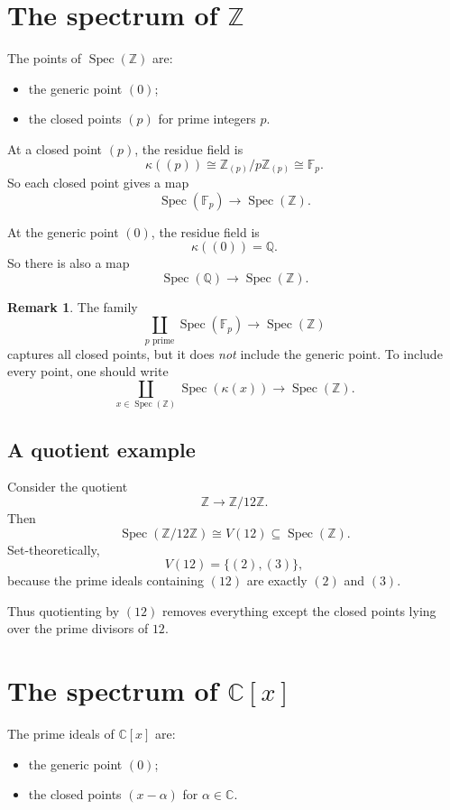 \documentclass[11pt]{article}
\theoremstyle{definition}
\newtheorem{remark}[theorem]{Remark}
\newcommand{\Z}{\mathbb{Z}}
\newcommand{\Q}{\mathbb{Q}}
\newcommand{\C}{\mathbb{C}}
\newcommand{\F}{\mathbb{F}}
\newcommand{\Spec}{\operatorname{Spec}}
\newcommand{\kk}[1]{\kappa\!\left(#1\right)}
\begin{document}
	\section{The spectrum of $\Z$}
	
	The points of $\Spec(\Z)$ are:
	
	\begin{itemize}
		\item the generic point $(0)$;
		\item the closed points $(p)$ for prime integers $p$.
	\end{itemize}
	
	At a closed point $(p)$, the residue field is
	\[
	\kk{(p)}\cong \Z_{(p)}/p\Z_{(p)}\cong \F_p.
	\]
	So each closed point gives a map
	\[
	\Spec(\F_p)\longrightarrow \Spec(\Z).
	\]
	
	At the generic point $(0)$, the residue field is
	\[
	\kk{(0)}=\Q.
	\]
	So there is also a map
	\[
	\Spec(\Q)\longrightarrow \Spec(\Z).
	\]
	
	\begin{remark}
		The family
		\[
		\coprod_{p\text{ prime}}\Spec(\F_p)\longrightarrow \Spec(\Z)
		\]
		captures all closed points, but it does \emph{not} include the generic point. To include every point, one should write
		\[
		\coprod_{x\in \Spec(\Z)}\Spec(\kk{x})\longrightarrow \Spec(\Z).
		\]
	\end{remark}
	
	\subsection{A quotient example}
	
	Consider the quotient
	\[
	\Z\longrightarrow \Z/12\Z.
	\]
	Then
	\[
	\Spec(\Z/12\Z)\cong V(12)\subseteq \Spec(\Z).
	\]
	Set-theoretically,
	\[
	V(12)=\{(2),(3)\},
	\]
	because the prime ideals containing $(12)$ are exactly $(2)$ and $(3)$.
	
	Thus quotienting by $(12)$ removes everything except the closed points lying over the prime divisors of $12$.
	
	\section{The spectrum of $\C[x]$}
	
	The prime ideals of $\C[x]$ are:
	
	\begin{itemize}
		\item the generic point $(0)$;
		\item the closed points $(x-\alpha)$ for $\alpha\in \C$.
	\end{itemize}
	
\end{document}
